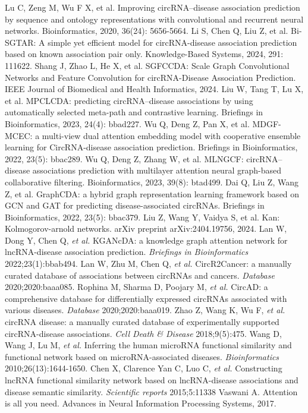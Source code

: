 \documentclass{bioinfo}
\begin{document}
\begin{thebibliography}{}
%
Lu C, Zeng M, Wu F X, et al. Improving circRNA–disease association prediction by sequence and ontology representations with convolutional and recurrent neural networks. Bioinformatics, 2020, 36(24): 5656-5664.
%
Li S, Chen Q, Liu Z, et al. Bi-SGTAR: A simple yet efficient model for circRNA-disease association prediction based on known association pair only. Knowledge-Based Systems, 2024, 291: 111622.
Shang J, Zhao L, He X, et al. SGFCCDA: Scale Graph Convolutional Networks and Feature Convolution for circRNA-Disease Association Prediction. IEEE Journal of Biomedical and Health Informatics, 2024.
Liu W, Tang T, Lu X, et al. MPCLCDA: predicting circRNA–disease associations by using automatically selected meta-path and contrastive learning. Briefings in Bioinformatics, 2023, 24(4): bbad227.
Wu Q, Deng Z, Pan X, et al. MDGF-MCEC: a multi-view dual attention embedding model with cooperative ensemble learning for CircRNA-disease association prediction. Briefings in Bioinformatics, 2022, 23(5): bbac289.
Wu Q, Deng Z, Zhang W, et al. MLNGCF: circRNA–disease associations prediction with multilayer attention neural graph-based collaborative filtering. Bioinformatics, 2023, 39(8): btad499.
Dai Q, Liu Z, Wang Z, et al. GraphCDA: a hybrid graph representation learning framework based on GCN and GAT for predicting disease-associated circRNAs. Briefings in Bioinformatics, 2022, 23(5): bbac379.
Liu Z, Wang Y, Vaidya S, et al. Kan: Kolmogorov-arnold networks. arXiv preprint arXiv:2404.19756, 2024.
%
Lan W, Dong Y, Chen Q, {\it et al.} KGANcDA: a knowledge graph attention network for lncRNA-disease association prediction. {\it Briefings in Bioinformatics} 2022;23(1):bbab494.
Lan W, Zhu M, Chen Q, {\it et al.} CircR2Cancer: a manually curated database of associations between circRNAs and cancers. {\it Database} 2020;2020:baaa085.
Rophina M, Sharma D, Poojary M, {\it et al.} CircAD: a comprehensive database for differentially expressed circRNAs associated with various diseases. {\it Database} 2020;2020:baaa019.
Zhao Z, Wang K, Wu F, {\it et al.} circRNA disease: a manually curated database of experimentally supported circRNA-disease associations. {\it Cell Death \& Disease} 2018;9(5):475.
Wang D, Wang J, Lu M, {\it et al.} Inferring the human microRNA functional similarity and functional network based on microRNA-associated diseases. {\it Bioinformatics} 2010;26(13):1644-1650.
Chen X, Clarence Yan C, Luo C, {\it et al.} Constructing lncRNA functional similarity network based on lncRNA-disease associations and disease semantic similarity. {\it Scientific reports} 2015;5:11338
Vaswani A. Attention is all you need. Advances in Neural Information Processing Systems, 2017.


\end{thebibliography}
\end{document}
